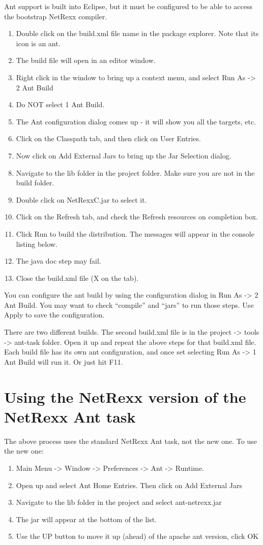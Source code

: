 Ant support is built into Eclipse, but it must be configured to be
able to access the bootstrap NetRexx compiler.
\begin{enumerate}
\item Double click on the build.xml file name in the package explorer.
   Note that its icon is an ant.
\item The build file will open in an editor window.
\item Right click in the window to bring up a context menu, and select
   Run As -> 2 Ant Build
\item Do NOT select 1 Ant Build.
\item The Ant configuration dialog comes up - it will show you all the
   targets, etc.
\item Click on the Classpath tab, and then click on User Entries.
\item Now click on Add External Jars to bring up the Jar Selection
   dialog.
\item Navigate to the lib folder in the project folder.  Make sure you
   are not in the build folder.
\item Double click on NetRexxC.jar to select it.
\item Click on the Refresh tab, and check the Refresh resources on
   completion box.
\item Click Run to build the distribution.  The messages will appear in
   the console listing below.
\item The java doc step may fail.
\item Close the build.xml file (X on the tab).
\end{enumerate}
You can configure the ant build by using the configuration dialog in
Run As -> 2 Ant Build.  You may want to check ``compile'' and ``jars''
to run those steps.  Use Apply to save the configuration.
 
There are two different builds.  The second build.xml file is in the
project -> tools -> ant-task folder.
Open it up and repeat the above steps for that build.xml file.  Each
build file has its own ant configuration, and once set selecting Run
As -> 1 Ant Build will run it.  Or just hit F11.
 
\section{Using the NetRexx version of the NetRexx Ant task}
 
The above process uses the standard NetRexx Ant task, not the new
one.  To use the new one:
\begin{enumerate}
\item Main Menu -> Window -> Preferences -> Ant -> Runtime.
\item Open up and select Ant Home Entries.  Then click on Add External
Jars
\item Navigate to the lib folder in the project and select
ant-netrexx.jar
\item The jar will appear at the bottom of the list.
\item Use the UP button to move it up (ahead) of the apache ant version,
click OK
\end{enumerate}

